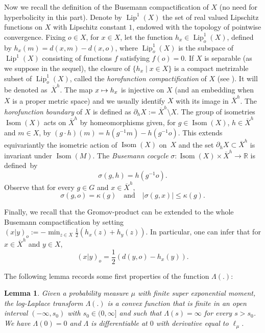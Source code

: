 \documentclass[JEP,XML,SOM,Unicode,published]{cedram}
\newcommand\mto{\mathchoice{\longmapsto}{\mapsto}{\mapsto}{\mapsto}}
\let\sep\mid
\newcommand{\qand}{\quad\text{and}\quad}
\theoremstyle{plain}
\newtheorem{lemma}[theorem]{Lemma}
\theoremstyle{definition}
\DeclareMathOperator\Isom{Isom}
\DeclareMathOperator\Lip{Lip}
\begin{document}
Now we recall the definition of the Busemann compactification of $X$ (no need for hyperbolicity in this part). Denote by $\Lip^1(X)$ the set of real valued Lipschitz functions on $X$ with Lipschitz constant $1$, endowed with the topology of pointwise convergence. Fixing $o \in X$, for $x \in X$, let the function $h_x \in \Lip_{o}^1(X)$, defined by $h_x(m)=d(x,m)-d(x,o)$, where $\Lip_{o}^1(X)$ is the subspace of $\Lip^1(X)$ consisting of functions $f$ satisfying $f(o)=0$. If $X$ is separable (as we suppose in the sequel), the closure of $\{h_x \sep x \in X\}$ is a compact metrizable subset of $\Lip^1_o(X)$, called the \textit{horofunction compactification} of $X$ (see \eg \cite[Prop.\,3.1]{maher-tiozzo}). It will be denoted as~$\overline{X}^h$. The map $x \mto h_x$ is injective on $X$ (and an embedding when $X$ is a proper metric space) and we usually identify $X$ with its image in $\overline{X}^h$. The \textit{horofunction boundary} of $X$ is defined as $\partial_h X:=\overline{X}^h\setminus X$. The group of isometries $\Isom(X)$ acts on $\overline{X}^h$ by homeomorphisms given, for $g \in \Isom(X)$, $h \in \overline{X}^h$ and $m \in X$, by $(g\cdot h)(m)=h(g^{-1}m)-h(g^{-1}o)$. This extends equivariantly the isometric action of $\Isom(X)$ on~$X$ and the set $\partial_h X \subset \overline{X}^h$ is invariant under $\Isom(M)$. The \textit{Busemann cocycle} \hbox{$\sigma: \Isom(X) \times \overline{X}^h \to \mathbb{R}$} is defined~by\vspace*{-3pt}
\[
\sigma(g,h)=h(g^{-1}o).
\]
Observe that for every $g\in G$ and $x\in \overline{X}^h$,\vspace*{-3pt}
\begin{equation}\label{useful}\sigma(g,o)=\kappa(g)\qand |\sigma(g,x)|\leq \kappa(g).
\end{equation}

Finally, we recall that the Gromov-product can be extended to the whole Busemann compactification by setting $(x|y)_o:=-\min_{z\in X}{\frac{1}{2}(h_x(z)+h_y(z))}$. In particular, one can infer that for $x\in \overline{X}^h$ and\vspace*{-3pt}
$y\in X$, \begin{equation}\label{gromov.extended.space.boundary}(x|y)_o=\frac{1}{2} (d(y,o)-h_x(y)).\end{equation}

\iffalse
The following lemma records some first properties of the function $\Lambda(.)$:
\begin{lemma}
Given a probability measure $\mu$ with finite super exponential moment, the log-Laplace transform $\Lambda(.)$ is a convex function that is finite in an open interval $(-\infty,s_0)$ with $s_0 \in (0,\infty] $ and such that $\Lambda(s)=\infty$ for every $s>s_0$. We have $\Lambda(0)=0$ and $\Lambda$ is differentiable at $0$ with derivative equal to $\ell_{\mu}$.
\end{lemma}
\end{document}

